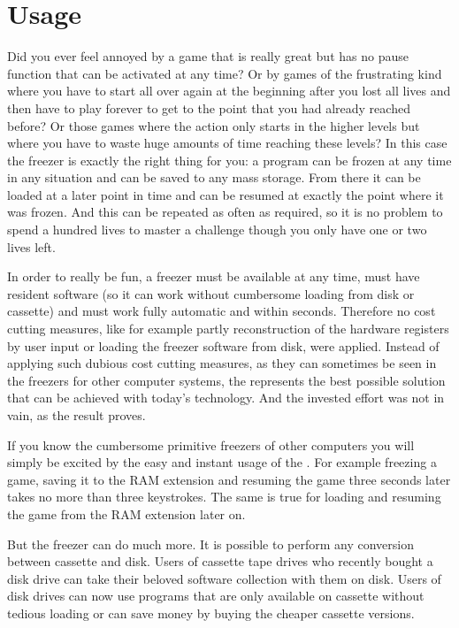 \chapter{Usage}

Did you ever feel annoyed by a game that is really great but has no pause
function that can be activated at any time? Or by games of the frustrating kind
where you have to start all over again at the beginning after you lost all lives and
then have to play forever to get to the point that you had already reached
before? Or those games where the action only starts in the higher levels but
where you have to waste huge amounts of time reaching these levels? In this case
the freezer is exactly the right thing for you: a program can be frozen at any
time in any situation and can be saved to any mass storage. From there it can be
loaded at a later point in time and can be resumed at exactly the point where it
was frozen. And this can be repeated as often as required, so it is no problem to
spend a hundred lives to master a challenge though you only have one or two
lives left.

In order to really be fun, a freezer must be available at any time, must have
resident software (so it can work without cumbersome loading from disk or
cassette) and must work fully automatic and within seconds. Therefore no cost
cutting measures, like for example partly reconstruction of the hardware
registers by user input or loading the freezer software from disk, were applied.
Instead of applying such dubious cost cutting measures, as they can sometimes be
seen in the freezers for other computer systems, the \frz represents the best
possible solution that can be achieved with today's technology. And the
invested effort was not in vain, as the result proves.

If you know the cumbersome primitive freezers of other computers you will simply
be excited by the easy and instant usage of the \frz. For example freezing a
game, saving it to the RAM extension and resuming  the game three seconds later
takes no more than three keystrokes. The same is true for loading and resuming
the game from the RAM extension later on.

But the freezer can do much more. It is possible to perform any conversion
between cassette and disk. Users of cassette tape drives who recently bought a
disk drive can take their beloved software collection with them on disk. Users
of disk drives can now use programs that are only available on cassette without
tedious loading or can save money by buying the cheaper cassette
versions.


